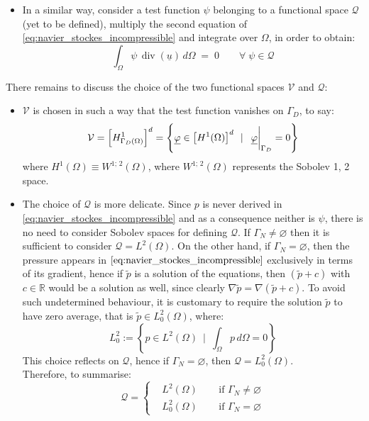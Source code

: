 \documentclass[11pt,a4paper]{article}
\newcommand{\R}{\mathds{R}}
\renewcommand{\vec}[1]{\underline{#1}} %
\let\oldforall\forall
\renewcommand{\forall}{\oldforall \; }
\DeclareMathOperator{\Div}{div}
\begin{document}
\begin{itemize}
    \item In a similar way, consider a test function $\psi$ belonging to a functional space $\mathcal{Q}$ (yet to be defined), multiply the second equation of \eqref{eq:navier_stockes_incompressible} and integrate over $\Omega$, in order to obtain: 
    \begin{equation}
        \int_{\Omega} \psi \, \Div(\vec{u}) \, d \Omega \; = \; 0 \qquad \forall \psi \in \mathcal{Q}
    \end{equation}
\end{itemize}
There remains to discuss the choice of the two functional spaces $\mathcal{V}$ and $\mathcal{Q}$: 
\begin{itemize}
    \item $\mathcal{V}$ is chosen in such a way that the test function vanishes on $\Gamma_{D}$, to say: 
    \begin{equation*}
        \mathcal{V} = \left[ H^{1}_{\Gamma_{D}(\Omega)}\right]^{d} = \left\{ \vec{\varphi} \in \left[ H^{1}(\Omega)\right]^{d} \enspace | \enspace \eval{\vec{\varphi}}_{\Gamma_{D}} = 0 \right\}
    \end{equation*}
    where $H^{1}(\Omega) \equiv W^{1; \, 2}(\Omega)$, where $W^{1; \, 2}(\Omega)$ represents the Sobolev 1, 2 space.

    \item The choice of $\mathcal{Q}$ is more delicate. Since $p$ is never derived in \eqref{eq:navier_stockes_incompressible} and as a consequence neither is $\psi$, there is no need to consider Sobolev spaces for defining $\mathcal{Q}$. If $\Gamma_{N} \neq \varnothing$ then it is sufficient to consider $\mathcal{Q} = L^{2}(\Omega)$. On the other hand, if $\Gamma_{N} = \varnothing$, then the pressure appears in $\eqref{eq:navier_stockes_incompressible}$ exclusively in terms of its gradient, hence if $\tilde{p}$ is a solution of the equations, then $(\tilde{p} + c)$ with $c \in \R$ would be a solution as well, since clearly $\nabla \tilde{p} = \nabla (\tilde{p} + c)$. To avoid such undetermined behaviour, it is customary to require the solution $\tilde{p}$ to have zero average, that is $\tilde{p} \in L^{2}_{0}(\Omega)$, where: 
    \begin{equation*}
        L^{2}_{0} := \left\{ p \in L^{2}(\Omega) \enspace | \enspace \int_{\Omega}p \, d\Omega = 0 \right\}
    \end{equation*}
    This choice reflects on $\mathcal{Q}$, hence if $\Gamma_{N} = \varnothing$, then $\mathcal{Q} = L^{2}_{0}(\Omega)$. \\
    Therefore, to summarise: 
    \begin{equation*}
    \mathcal{Q} = \left\{ \begin{aligned}
                     &L^{2}(\Omega) \enspace &&\text{if } \Gamma_{N} \neq \varnothing\\
                     &L^{2}_{0}(\Omega) && \text{if } \Gamma_{N} = \varnothing
                  \end{aligned} \right.
    \end{equation*}
\end{itemize}
\end{document}
